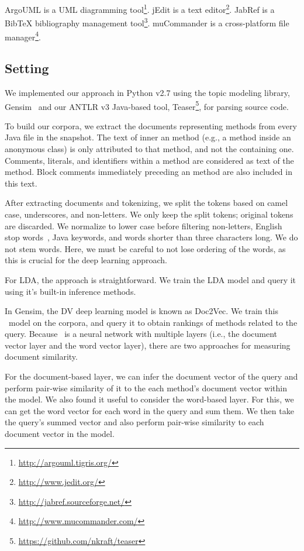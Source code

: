 ArgoUML is a UML diagramming tool\footnote{\url{http://argouml.tigris.org/}}.
jEdit is a text editor\footnote{\url{http://www.jedit.org/}}.
JabRef is a BibTeX bibliography management tool\footnote{\url{http://jabref.sourceforge.net/}}.
muCommander is a cross-platform file manager\footnote{\url{http://www.mucommander.com/}}.

\subsection{Setting}

We implemented our approach in Python v2.7 using the topic modeling library,
Gensim~\cite{Rehurek-Sojk_2010} and our ANTLR v3 Java-based tool,
Teaser\footnote{\url{https://github.com/nkraft/teaser}}, for parsing source
code.

To build our corpora, we extract the documents representing methods from every
Java file in the snapshot.  The text of inner an method (e.g., a method inside
an anonymous class) is only attributed to that method, and not the containing
one.  Comments, literals, and identifiers within a method are considered as text
of the method.  Block comments immediately preceding an method are also included
in this text.

After extracting documents and tokenizing, we split the tokens based on camel
case, underscores, and non-letters.  We only keep the split tokens; original
tokens are discarded.  We normalize to lower case before filtering non-letters,
English stop words~\cite{Fox_1992}, Java keywords, and words shorter than three
characters long.  We do not stem words. Here, we must be careful to not lose
ordering of the words, as this is crucial for the deep learning approach.

For LDA, the approach is straightforward. We train the LDA model and query it
using it's built-in inference methods.

In Gensim, the DV deep learning model is known as Doc2Vec.
We train this \dv\ model on the corpora, and query it to obtain rankings of
methods related to the query. Because \dv\ is a neural network with multiple
layers (i.e., the document vector layer and the word vector layer), there are two
approaches for measuring document similarity.

For the document-based layer, we can infer the document vector of the query and
perform pair-wise similarity of it to the each method's document vector within
the model.  We also found it useful to consider the word-based layer. For this,
we can get the word vector for each word in the query and sum them. We then take
the query's summed vector and also perform pair-wise similarity to each document
vector in the model.

